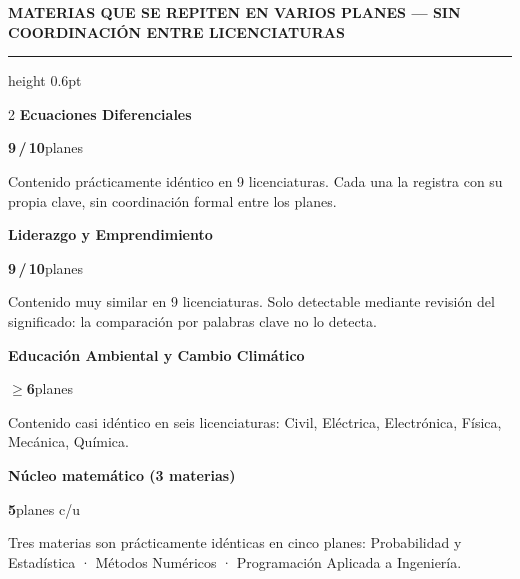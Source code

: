 \documentclass[9pt,a4paper]{article}
\newcommand{\BIGNUMK}[1]%
  {{\fontsize{20}{22}\selectfont\ttfamily\bfseries\color{paperbg}#1}}
\newcommand{\NOTE}[1]{{\tiny\color{graymid}#1}}
\newcommand{\SECHEAD}[1]{%
  {\fontsize{6}{7}\selectfont\bfseries\color{paperbg}\MakeUppercase{#1}}%
  \par\nointerlineskip\vspace{1pt}%
  {\color{uamred}\hrule height 0.6pt}\par\vspace{3pt}}
\begin{document}
\vfill

\begin{tcolorbox}[band]
\SECHEAD{materias que se repiten en varios planes — sin coordinación entre licenciaturas}
\begin{minipage}[t]{\linewidth}
\begin{multicols}{2}
\raggedcolumns
{\footnotesize\bfseries Ecuaciones Diferenciales}\par\vspace{2pt}
\BIGNUMK{9\,/\,10}{\tiny\;planes}\par\vspace{2pt}
\NOTE{Contenido prácticamente idéntico en 9 licenciaturas.
Cada una la registra con su propia clave, sin coordinación formal entre los planes.}
\par\vspace{5pt}
{\footnotesize\bfseries Liderazgo y Emprendimiento}\par\vspace{2pt}
\BIGNUMK{9\,/\,10}{\tiny\;planes}\par\vspace{2pt}
\NOTE{Contenido muy similar en 9 licenciaturas.
Solo detectable mediante revisión del significado:
la comparación por palabras clave no lo detecta.}
\columnbreak

{\footnotesize\bfseries Educación Ambiental y Cambio Climático}\par\vspace{2pt}
\BIGNUMK{${\geq}$6}{\tiny\;planes}\par\vspace{2pt}
\NOTE{Contenido casi idéntico en seis licenciaturas:
Civil, Eléctrica, Electrónica, Física, Mecánica, Química.}
\par\vspace{5pt}
{\footnotesize\bfseries Núcleo matemático (3 materias)}\par\vspace{2pt}
\BIGNUMK{5}{\tiny\;planes c/u}\par\vspace{2pt}
\NOTE{Tres materias son prácticamente idénticas en cinco planes:
Probabilidad y Estadística ·
Métodos Numéricos · Programación Aplicada a Ingeniería.}
\end{multicols}
\end{minipage}
\end{tcolorbox}

\vfill
\end{document}
